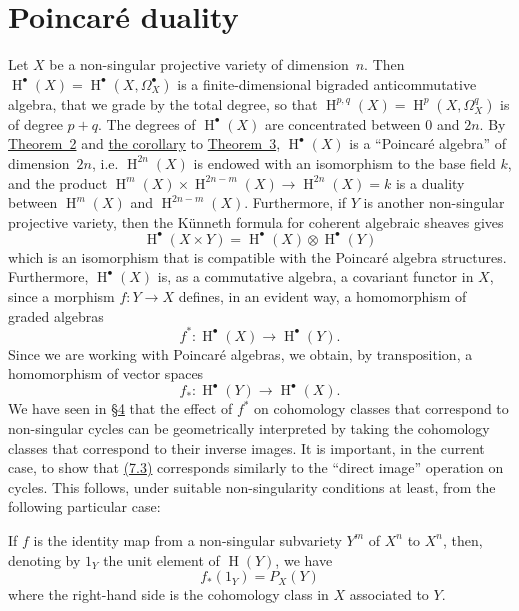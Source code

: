 \documentclass{article}
\theoremstyle{plain}
\newenvironment{theorem}[1]
  {\renewcommand\theinnertheorem{#1}\innertheorem}
  {\endinnertheorem}
\theoremstyle{definition}
\DeclareMathOperator{\HH}{H}
\newcommand{\oldpage}[1]{\marginpar{\footnotesize$\Big\vert$ \textit{p.~#1}}}
\begin{document}
\section{Poincar\'{e} duality}
\label{section7}

Let $X$ be a non-singular projective variety of dimension~$n$.
Then $\HH^\bullet(X)=\HH^\bullet(X,\Omega_X^\bullet)$ is a finite-dimensional bigraded anticommutative algebra, that we grade by the total degree, so that $\HH^{p,q}(X)=\HH^p(X,\Omega_X^q)$ is of degree $p+q$.
The degrees of $\HH^\bullet(X)$ are concentrated between $0$ and $2n$.
By \hyperref[theorem2]{Theorem~2} and \hyperref[theorem3corollary]{the corollary} to \hyperref[theorem3]{Theorem~3}, $\HH^\bullet(X)$ is a ``Poincar\'{e} algebra'' of dimension~$2n$, i.e. $\HH^{2n}(X)$ is endowed with an isomorphism to the base field $k$, and the product $\HH^m(X)\times\HH^{2n-m}(X)\to\HH^{2n}(X)=k$ is a duality between $\HH^m(X)$ and $\HH^{2n-m}(X)$.
Furthermore, if $Y$ is another non-singular projective variety, then the K\"{u}nneth formula for coherent algebraic sheaves gives
\[
\label{7.1}
  \HH^\bullet(X\times Y) = \HH^\bullet(X)\otimes\HH^\bullet(Y)
\tag{7.1}
\]
which is an isomorphism that is compatible with the Poincar\'{e} algebra structures.
Furthermore, $\HH^\bullet(X)$ is, as a commutative algebra, a covariant functor in $X$, since a morphism $f\colon Y\to X$ defines, in an evident way, a homomorphism of graded algebras
\oldpage{149-20}
\[
\label{7.2}
  f^*\colon \HH^\bullet(X)\to\HH^\bullet(Y).
\tag{7.2}
\]
Since we are working with Poincar\'{e} algebras, we obtain, by transposition, a homomorphism of vector spaces
\[
\label{7.3}
  f_*\colon \HH^\bullet(Y)\to\HH^\bullet(X).
\tag{7.3}
\]
We have seen in \hyperref[section4]{\S4} that the effect of $f^*$ on cohomology classes that correspond to non-singular cycles can be geometrically interpreted by taking the cohomology classes that correspond to their inverse images.
It is important, in the current case, to show that \hyperref[7.3]{(7.3)} corresponds similarly to the ``direct image'' operation on cycles.
This follows, under suitable non-singularity conditions at least, from the following particular case:

\begin{theorem}{4}
\label{theorem4}
  If $f$ is the identity map from a non-singular subvariety $Y^m$ of $X^n$ to $X^n$, then, denoting by $1_Y$ the unit element of $\HH(Y)$, we have
  \[
  \label{7.4}
    f_*(1_Y) = P_X(Y)
  \tag{7.4}
  \]
  where the right-hand side is the cohomology class in $X$ associated to $Y$.
\end{theorem}
\end{document}
